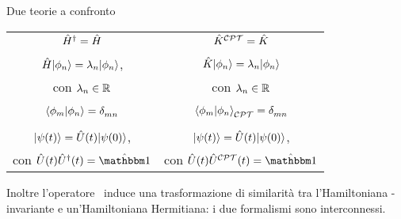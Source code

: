 \begin{frame}{Due teorie a confronto}
    \begin{table}
        \centering
        \begin{tabular}{c|c}
            $\hat{H}^\dag = \hat{H}$ & $\hat{K}^{\mathcal{C}\mathcal{P}\mathcal{T}} = \hat{K}$ \pause\\\\
            $\hat{H}\!\ket{\phi_n} = \lambda_n\!\ket{\phi_n}$, & $\hat{K}\!\ket{\phi_n} = \lambda_n\!\ket{\phi_n}$ \\
            con $\lambda_n\in\mathbb{R}$ & con $\lambda_n\in\mathbb{R}$ \pause\\\\
            $\braket{\phi_m}{\phi_n} = \tensor{\delta}{_m_n}$ & $\braket{\phi_m}{\phi_n}_{\CPT} = \tensor{\delta}{_m_n}$ \pause\\\\
            $\displaystyle \ket{\psi{\pqty{t}}} = \hU\pqty{t} \!\ket{\psi\pqty{0}}$, & $\displaystyle \ket{\psi{\pqty{t}}} = \hU\pqty{t} \!\ket{\psi\pqty{0}}$, \\
            con $\hU\pqty{t} \hU^\dag\pqty{t} = \hidM$ & con $\hU\pqty{t} \hU^{\CPT}\pqty{t} = \hidM$
        \end{tabular}
    \end{table}
    \pause
    Inoltre l'operatore \hC\ induce una trasformazione di similarità tra l'Hamiltoniana \PT-invariante e un'Hamiltoniana Hermitiana: i due formalismi sono interconnessi.
\end{frame}

